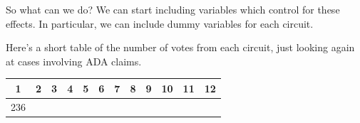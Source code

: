 \documentclass[12pt,twoside]{article}
\begin{document}
So what can we do? We can start including variables which control for
these effects. In particular, we can include dummy variables for each
circuit.

Here's a short table of the number of votes from each circuit, just
looking again at cases involving ADA claims.

\begin{longtable}[c]{@{}cccccccccccc@{}}
\toprule
\begin{minipage}[b]{0.04\columnwidth}\centering\strut
1
\strut\end{minipage} &
\begin{minipage}[b]{0.04\columnwidth}\centering\strut
2
\strut\end{minipage} &
\begin{minipage}[b]{0.04\columnwidth}\centering\strut
3
\strut\end{minipage} &
\begin{minipage}[b]{0.04\columnwidth}\centering\strut
4
\strut\end{minipage} &
\begin{minipage}[b]{0.04\columnwidth}\centering\strut
5
\strut\end{minipage} &
\begin{minipage}[b]{0.04\columnwidth}\centering\strut
6
\strut\end{minipage} &
\begin{minipage}[b]{0.04\columnwidth}\centering\strut
7
\strut\end{minipage} &
\begin{minipage}[b]{0.04\columnwidth}\centering\strut
8
\strut\end{minipage} &
\begin{minipage}[b]{0.04\columnwidth}\centering\strut
9
\strut\end{minipage} &
\begin{minipage}[b]{0.05\columnwidth}\centering\strut
10
\strut\end{minipage} &
\begin{minipage}[b]{0.05\columnwidth}\centering\strut
11
\strut\end{minipage} &
\begin{minipage}[b]{0.05\columnwidth}\centering\strut
12
\strut\end{minipage}\tabularnewline
\midrule
\endhead
\begin{minipage}[t]{0.04\columnwidth}\centering\strut
236
\strut\end{minipage} &
\begin{minipage}[t]{0.04\columnwidth}\centering\strut

\end{minipage}
\end{longtable}
\end{document}
